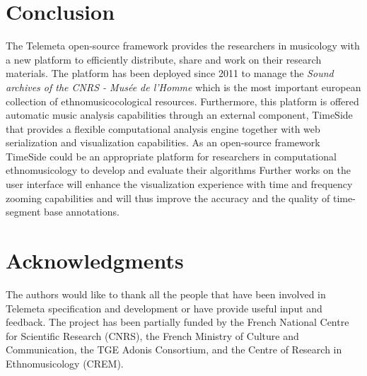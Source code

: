 \documentclass{sig-alternate}
\begin{document}
\section{Conclusion}
The Telemeta open-source framework provides the researchers in musicology with a new platform to efficiently distribute, share and work on their research materials.
The platform has been deployed since 2011 to manage the \emph{Sound archives of the CNRS - Musée de l'Homme} which is the most important european collection of ethnomusicocological resources.
Furthermore, this platform is offered automatic music analysis capabilities through an external component, TimeSide that provides a flexible computational analysis engine together with web serialization and visualization capabilities. As an open-source framework TimeSide could be an appropriate platform for researchers in computational ethnomusicology to develop and evaluate their algorithms
Further works on the user interface will enhance the visualization experience with time and frequency zooming capabilities and will thus improve the accuracy and the quality of time-segment base annotations.
\section*{Acknowledgments} 
{\small The authors would like to thank all the people that have been involved in Telemeta specification and development or have provide useful input and feedback. 
The project has been partially funded by the French National Centre for Scientific Research (CNRS), the French Ministry of Culture and Communication, the TGE Adonis Consortium, and the Centre of Research in Ethnomusicology (CREM).}
%


\end{document}
